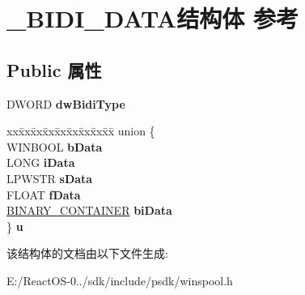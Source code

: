 \hypertarget{struct___b_i_d_i___d_a_t_a}{}\section{\+\_\+\+B\+I\+D\+I\+\_\+\+D\+A\+T\+A结构体 参考}
\label{struct___b_i_d_i___d_a_t_a}
\subsection*{Public 属性}
\begin{DoxyCompactItemize}
\item 
\mbox{\label{struct___b_i_d_i___d_a_t_a_ad5067639d7701efc139ea272a1add22c}} 
D\+W\+O\+RD {\bfseries dw\+Bidi\+Type}
\item 
\mbox{\label{struct___b_i_d_i___d_a_t_a_abc3f2a78560cc953ff71478554640a78}} 
\begin{tabbing}
xx\=xx\=xx\=xx\=xx\=xx\=xx\=xx\=xx\=\kill
union \{\\
\>WINBOOL {\bfseries bData}\\
\>LONG {\bfseries iData}\\
\>LPWSTR {\bfseries sData}\\
\>FLOAT {\bfseries fData}\\
\>\hyperlink{struct___b_i_n_a_r_y___c_o_n_t_a_i_n_e_r}{BINARY\_CONTAINER} {\bfseries biData}\\
\} {\bfseries u}\\

\end{tabbing}\end{DoxyCompactItemize}


该结构体的文档由以下文件生成\+:\begin{DoxyCompactItemize}
\item 
E\+:/\+React\+O\+S-\/0../sdk/include/psdk/winspool.\+h\end{DoxyCompactItemize}

